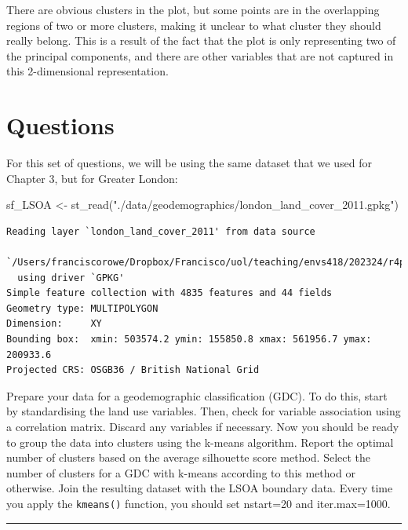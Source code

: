 \documentclass[
  letterpaper,
  DIV=11,
  numbers=noendperiod]{scrreprt}
\newenvironment{Shaded}{\begin{snugshade}}{\end{snugshade}}
\newcommand{\FunctionTok}[1]{\textcolor[rgb]{0.28,0.35,0.67}{#1}}
\newcommand{\NormalTok}[1]{\textcolor[rgb]{0.00,0.23,0.31}{#1}}
\newcommand{\OtherTok}[1]{\textcolor[rgb]{0.00,0.23,0.31}{#1}}
\newcommand{\StringTok}[1]{\textcolor[rgb]{0.13,0.47,0.30}{#1}}
\begin{document}
There are obvious clusters in the plot, but some points are in the
overlapping regions of two or more clusters, making it unclear to what
cluster they should really belong. This is a result of the fact that the
plot is only representing two of the principal components, and there are
other variables that are not captured in this 2-dimensional
representation.

\hypertarget{questions}{%
\section{Questions}\label{questions}}

For this set of questions, we will be using the same dataset that we
used for Chapter 3, but for Greater London:

\begin{Shaded}
\begin{Highlighting}[]
\NormalTok{sf\_LSOA }\OtherTok{\textless{}{-}} \FunctionTok{st\_read}\NormalTok{(}\StringTok{"./data/geodemographics/london\_land\_cover\_2011.gpkg"}\NormalTok{)}
\end{Highlighting}
\end{Shaded}

\begin{verbatim}
Reading layer `london_land_cover_2011' from data source 
  `/Users/franciscorowe/Dropbox/Francisco/uol/teaching/envs418/202324/r4ps/data/geodemographics/london_land_cover_2011.gpkg' 
  using driver `GPKG'
Simple feature collection with 4835 features and 44 fields
Geometry type: MULTIPOLYGON
Dimension:     XY
Bounding box:  xmin: 503574.2 ymin: 155850.8 xmax: 561956.7 ymax: 200933.6
Projected CRS: OSGB36 / British National Grid
\end{verbatim}

Prepare your data for a geodemographic classification (GDC). To do this,
start by standardising the land use variables. Then, check for variable
association using a correlation matrix. Discard any variables if
necessary. Now you should be ready to group the data into clusters using
the k-means algorithm. Report the optimal number of clusters based on
the average silhouette score method. Select the number of clusters for a
GDC with k-means according to this method or otherwise. Join the
resulting dataset with the LSOA boundary data. Every time you apply the
\texttt{kmeans()} function, you should set nstart=20 and iter.max=1000.

\begin{center}\rule{0.5\linewidth}{0.5pt}\end{center}
\end{document}

